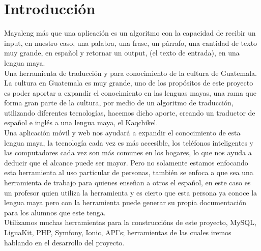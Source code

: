 \documentclass[a4paper,openright,11pt]{article}
\begin{document}
\newpage

\tableofcontents

\cleardoublepage
\listoffigures

\cleardoublepage
\listoftables

\newpage

\pagestyle{fancy}
\section{Introducci\'on}
Mayaleng más que una aplicación es un algoritmo con la capacidad de recibir un input, en nuestro caso, una palabra, una frase, un párrafo, una cantidad de texto muy grande, en español y retornar un output, (el texto de entrada), en una lengua maya. \\

Una herramienta de traducción y para conocimiento de la cultura de Guatemala.\\

La cultura en Guatemala es muy grande, uno de los propósitos de este proyecto es poder aportar a expandir el conocimiento en las lenguas mayas, una rama que forma gran parte de la cultura, por medio de un algoritmo de traducción, utilizando diferentes tecnologías, hacemos dicho aporte, creando un traductor de español e inglés a una lengua maya, el Kaqchikel.\\

Una aplicación móvil y web nos ayudará a expandir el conocimiento de esta lengua maya, la tecnología cada vez es más accesible, los teléfonos inteligentes y las computadores cada vez son más comunes en los hogares, lo que nos ayuda a deducir que el alcance puede ser mayor. Pero no solamente estamos enfocando esta herramienta al uso particular de personas, también se enfoca a que sea una herramienta de trabajo para quienes enseñan a otros el español, en este caso es un profesor quien utiliza la herramienta y es cierto que esta persona ya conoce la lengua maya pero con la herramienta puede generar su propia documentación para los alumnos que este tenga.\\

Utilizamos muchas herramientas para la construccións de este proyecto, MySQL, LiguaKit, PHP, Symfony, Ionic, API's; herramientas de las cuales iremos hablando en el desarrollo del proyecto.
\newpage
\end{document}
